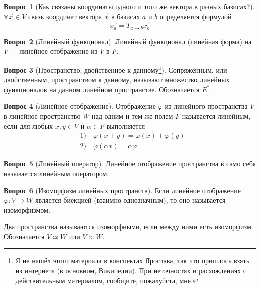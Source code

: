 \documentclass[a4paper,11pt]{article}
\theoremstyle{remark}
\theoremstyle{definition}
\newtheorem{question}{Вопрос}
\begin{document}
\begin{question}[Как связаны координаты одного и того же вектора в разных базисах?]
\(\forall \vec{x} \in V\) связь координат вектора \(\vec{x}\) в базисах \(a\) и \(b\) определяется формулой
\begin{equation*}
     \vec{x_a} = T_{a \rightarrow b}\vec{x_b}
\end{equation*} 
\end{question}


\begin{question}[Линейный функционал]
Линейный функционал (линейная форма) на \(V\) --- линейное отображение из \(V\) в \(F\).
\end{question}


\begin{question}[Пространство, двойственное к данному\footnote{\label{notfound}Я не нашёл этого материала в конспектах Ярослава, так что пришлось взять из интернета (в основном, Википедии). При неточностях и расхождениях с действительным материалом, сообщите, пожалуйста, мне.}]
Сопряжённым, или двойственным, пространством к данному, называют множество линейных функционалов на данном линейном пространстве. Обозначается \(E^*\).
\end{question}


\begin{question}[Линейное отображение]
Отображение \(\varphi\) из линейного пространства \(V\) в линейное пространство \(W\) над одним и тем же полем \(F\) называется линейным, если для любых \(x, y \in V\) и \(\alpha \in F\) выполняется
\begin{align*}
    &1)\quad\varphi(x + y) = \varphi(x) + \varphi(y) \\
    &2)\quad\varphi(\alpha{}x) = \alpha\varphi{}
\end{align*}
\end{question}


\begin{question}[Линейный оператор]
Линейное отображение пространства в само себя называется линейным оператором.
\end{question}


\begin{question}[Изоморфизм линейных пространств]
Если линейное отображение \(\varphi: V \rightarrow W\) является биекцией (взаимно однозначным), то оно называется изоморфизмом. 

Два пространства называются изоморфными, если между ними есть изоморфизм. Обозначается \(V \simeq W\) или \(V \approx W\).
\end{question}
\end{document}
